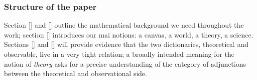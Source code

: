 \subsubsection*{Structure of the paper}
Section \ref{} and \ref{} outline the mathematical background we need throughout the work; section \ref{} introduces our mai notions: a canvas, a world, a theory, a science. Sections \ref{} and \ref{} will provide evidence that the two dictionaries, theoretical and observable, live in a very tight relation; a broadly intended meaning for the notion of \emph{theory} asks for a precise understanding of the category of adjunctions between the theoretical and observational side.